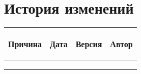 
\def \notincludehead{}
\def \maindoc{}








\section*{История изменений}
\noindent

\scriptsize
\begin{longtable}{|p{40mm}|p{20mm}|p{20mm}|p{60mm}|}
\hline
{\bf \parbox[c][5mm]{40mm}{\raggedright Причина}} & {\bf \parbox[c]{19mm}{\raggedright Дата}} & {\bf \parbox[c]{16mm}{\raggedright Версия}} & {\bf \parbox[c]{25mm}{\raggedright Автор}} \\
\hline
&&&\\
\hline
&&&\\
\hline
&&&\\
\hline
\end{longtable}  
\normalsize

\newpage

\footnotesize
\tableofcontents
\normalsize
\newpage




